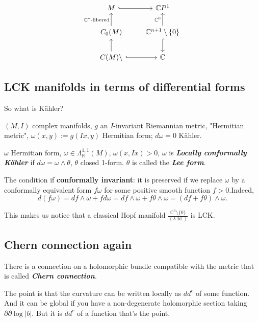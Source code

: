 \[\begin{tikzcd}
	M \arrow[r,hook]&  \mathbb{C}P^{1}\\
	C_0(M)\arrow[u,"\mathbb{C}^*\text{-fibered} "]&  \mathbb{C}^{n+1}\setminus\{0\}\arrow[u,"\mathbb{C}^0"]\arrow[d,hook]\\
	C(M)\setminus \arrow[ u]\arrow[r,hook]&\mathbb{C}
\end{tikzcd}\]


\subsection{LCK manifolds in terms of differential forms}

So what is Kähler?

\((M,I)\) complex manifolds, $ g$ an \(I\)-invariant Riemannian metric, "Hermitian metric", \(\omega(x,y):=g(Ix,y)\) Hermitian form; \(d \omega=0\) Kähler.

\begin{defn}\leavevmode
	\(\omega\) Hermitian form, \(\omega \in \Lambda^{1,1}_{\mathbb{R}}(M)\), \(\omega(x,Ix)>0\), \(\omega\) is \textit{\textbf{Locally conformally Kähler}} if \(d \omega= \omega \wedge \theta\), \(\theta\) closed 1-form. \(\theta\) is called the \textit{\textbf{Lee form}}.
\end{defn}

\begin{remark}\leavevmode
	The condition if \textbf{conformally invariant}: it is preserved if we replace \(\omega\) by a conformally equivalent form \(f \omega\) for some positive smooth function \(f>0\).Indeed,
	\[d(f \omega)=df \wedge \omega+f d \omega=df \wedge \omega +f \theta \wedge \omega=(df+f\theta)\wedge\omega.\]
\end{remark}

This makes us notice that a classical Hopf manifold \(\frac{\mathbb{C}^n\setminus\{0\}}{\left< \lambda \operatorname{Id}\right>}\) is LCK.

\subsection{Chern connection again}

There is a connection on a holomorphic bundle compatible with the metric that is called \textit{\textbf{Chern connection}}.

The point is that the curvature can be written locally as  \(d d^c\) of some function. And it can be global if you have a non-degenerate holomorphic section taking \(\partial \bar\partial \operatorname{log}|b|\). But it is \(d d^c\) of a function that's the point.

